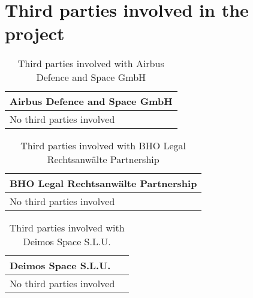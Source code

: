 \section{Third parties involved in the project}

\begin{table}[H]
	\centering
	\begin{tabular}{|p{10cm} p{4cm}|}
		\hline
		
		\multicolumn{2}{|p{14cm}|}{\textbf{Airbus Defence and Space GmbH}}\\
		
		\hline

		No third parties involved & \\
		
		\hline
	\end{tabular}
	\caption{Third parties involved with Airbus Defence and Space GmbH}
\end{table}



\begin{table}[H]
	\centering
	\begin{tabular}{|p{10cm} p{4cm}|}
		\hline
		
		\multicolumn{2}{|p{14cm}|}{\textbf{BHO Legal Rechtsanwälte Partnership}}\\
		
		\hline
		
		No third parties involved & \\
		
		\hline
		
	\end{tabular}
	\caption{Third parties involved with BHO Legal Rechtsanwälte Partnership}
\end{table}



\begin{table}[H]
	\centering
	\begin{tabular}{|p{10cm} p{4cm}|}
		\hline
		
		\multicolumn{2}{|p{14cm}|}{\textbf{Deimos Space S.L.U.}}\\
		
		\hline
		
		No third parties involved & \\
		
		\hline
		
	\end{tabular}
	\caption{Third parties involved with Deimos Space S.L.U.}
\end{table}




